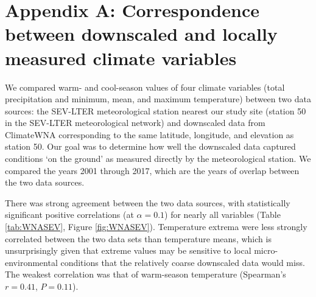 \documentclass[12pt]{article}\usepackage[]{graphicx}\usepackage[]{color}
\begin{document}
\newpage
\section*{Appendix A: Correspondence between downscaled and locally measured climate variables}
\renewcommand{\thefigure}{A\arabic{figure}}\setcounter{figure}{0}
\renewcommand{\thetable}{A\arabic{table}}\setcounter{table}{0}


We compared warm- and cool-season values of four climate variables (total precipitation and minimum, mean, and maximum temperature) between two data sources: the SEV-LTER meteorological station nearest our study site (station 50 in the SEV-LTER meteorological network) and downscaled data from ClimateWNA corresponding to the same latitude, longitude, and elevation as station 50. Our goal was to determine how well the downscaled data captured conditions `on the ground' as measured directly by the meteorological station. We compared the years 2001 through 2017, which are the years of overlap between the two data sources.

There was strong agreement between the two data sources, with statistically significant positive correlations (at $\alpha = 0.1$) for nearly all variables (Table \ref{tab:WNASEV}, Figure \ref{fig:WNASEV}). Temperature extrema were less strongly correlated between the two data sets than temperature means, which is unsurprisingly given that extreme values may be sensitive to local micro-environmental conditions that the relatively coarse downscaled data would miss. The weakest correlation was that of warm-season temperature (Spearman's $r = 0.41$, $P = 0.11$). 
\end{document}
